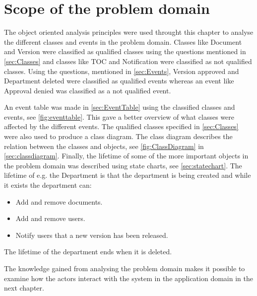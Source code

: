 \section{Scope of the problem domain}
The object oriented analysis principles were used throught this chapter to analyse the different classes and events in the problem domain.
Classes like Document and Version were classified as qualified classes using the questions mentioned in \cref{sec:Classes} and classes like TOC and Notification were classified as not qualified classes.
Using the questions, mentioned in \cref{sec:Events}, Version approved and Department deleted were classified as qualified events whereas an event like Approval denied was classified as a not qualified event.

An event table was made in \cref{sec:EventTable} using the classified classes and events, see \cref{fig:eventtable}.
This gave a better overview of what classes were affected by the different events.
The qualified classes specified in \cref{sec:Classes} were also used to produce a class diagram.
The class diagram describes the relation between the classes and objects, see \cref{fig:ClassDiagram} in \cref{sec:classdiagram}.
Finally, the lifetime of some of the more important objects in the problem domain was described using state charts, see \cref{sec:statechart}.
The lifetime of e.g. the Department is that the department is being created and while it exists the department can:

\begin{itemize}
	\item Add and remove documents.
	\item Add and remove users.
	\item Notify users that a new version has been released.
\end{itemize}

The lifetime of the department ends when it is deleted.

The knowledge gained from analysing the problem domain makes it possible to examine how the actors interact with the system in the application domain in the next chapter.
